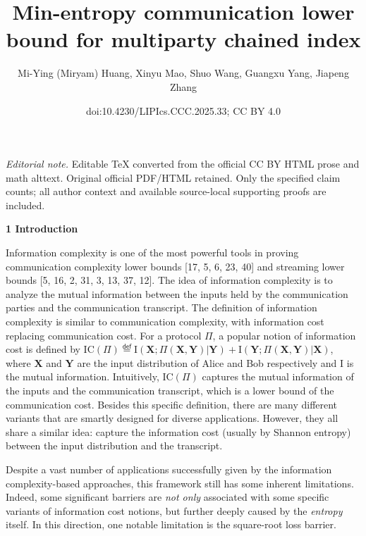 \documentclass[10pt,a4paper]{article}
\title{Min-entropy communication lower bound for multiparty chained index}
\author{Mi-Ying (Miryam) Huang, Xinyu Mao, Shuo Wang, Guangxu Yang, Jiapeng Zhang}
\date{doi:10.4230/LIPIcs.CCC.2025.33; CC BY 4.0}
\begin{document}
\maketitle
\noindent\textit{Editorial note.} Editable TeX converted from the official CC BY HTML prose and math alttext. Original official PDF/HTML retained. Only the specified claim counts; all author context and available source-local supporting proofs are included.\par\medskip


\par\medskip\noindent\textbf{
1 Introduction}\par




Information complexity is one of the most powerful tools in proving communication complexity lower bounds [17, 5, 6, 23, 40] and streaming lower bounds [5, 16, 2, 31, 3, 13, 37, 12]. The idea of information complexity is to analyze the mutual information between the inputs held by the communication parties and the communication transcript. The definition of information complexity is similar to communication complexity, with information cost replacing communication cost. For a protocol $\Pi$, a popular notion of information cost is defined by
$\text{IC}(\Pi)\stackrel{{\scriptstyle\mathsf{def}}}{{=}}\text{I}(\bm{X};\Pi(\bm{X},\bm{Y})|\bm{Y})+\text{I}(\bm{Y};\Pi(\bm{X},\bm{Y})|\bm{X})$, where $\bm{X}$ and $\bm{Y}$ are the input distribution of Alice and Bob respectively and I is the mutual information. Intuitively, $\text{IC}(\Pi)$ captures the mutual information of the inputs and the communication transcript, which is a lower bound of the communication cost. Besides this specific definition, there are many different variants that are smartly designed for diverse applications. However, they all share a similar idea: capture the information cost (usually by Shannon entropy) between the input distribution and the transcript.\par




Despite a vast number of applications successfully given by the information complexity-based approaches, this framework still has some inherent limitations. Indeed, some significant barriers are \emph{not only} associated with some specific variants of information cost notions, but further deeply caused by the \emph{entropy} itself. In this direction, one notable limitation is the square-root loss barrier.\par
\end{document}
